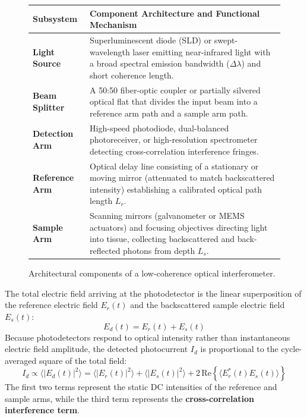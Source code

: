 \documentclass[11pt,a4paper]{article}
\begin{document}
\begin{figure}[htbp]
\centering
\begin{tabular}{p{3.2cm}p{11.5cm}}
\toprule
\textbf{Subsystem} & \textbf{Component Architecture and Functional Mechanism} \\
\midrule
\textbf{Light Source} & Superluminescent diode (SLD) or swept-wavelength laser emitting near-infrared light with a broad spectral emission bandwidth ($\Delta\lambda$) and short coherence length. \\
\textbf{Beam Splitter} & A 50:50 fiber-optic coupler or partially silvered optical flat that divides the input beam into a reference arm path and a sample arm path. \\
\textbf{Detection Arm} & High-speed photodiode, dual-balanced photoreceiver, or high-resolution spectrometer detecting cross-correlation interference fringes. \\
\textbf{Reference Arm} & Optical delay line consisting of a stationary or moving mirror (attenuated to match backscattered intensity) establishing a calibrated optical path length $L_r$. \\
\textbf{Sample Arm} & Scanning mirrors (galvanometer or MEMS actuators) and focusing objectives directing light into tissue, collecting backscattered and back-reflected photons from depth $L_s$. \\
\bottomrule
\end{tabular}
\caption{Architectural components of a low-coherence optical interferometer.}
\label{tab:oct_components}
\end{figure}

The total electric field arriving at the photodetector is the linear superposition of the reference electric field $E_r(t)$ and the backscattered sample electric field $E_s(t)$:
\begin{equation}
    E_d(t) = E_r(t) + E_s(t)
\end{equation}
Because photodetectors respond to optical intensity rather than instantaneous electric field amplitude, the detected photocurrent $I_d$ is proportional to the cycle-averaged square of the total field:
\begin{equation}
    I_d \propto \langle |E_d(t)|^2 \rangle = \langle |E_r(t)|^2 \rangle + \langle |E_s(t)|^2 \rangle + 2 \, \text{Re} \left\{ \langle E_r^*(t) E_s(t) \rangle \right\}
\end{equation}
The first two terms represent the static DC intensities of the reference and sample arms, while the third term represents the \textbf{cross-correlation interference term}.
\end{document}
